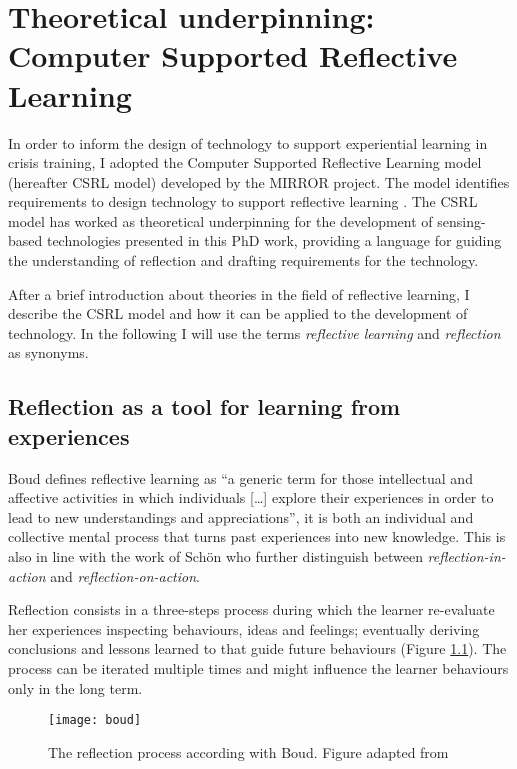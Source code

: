 \chapter{Theoretical underpinning: Computer Supported Reflective Learning}\label{csrl}


In order to inform the design of technology to support experiential learning in crisis training, I adopted the Computer Supported Reflective Learning model (hereafter CSRL model) developed by the MIRROR project. The model identifies requirements to design technology to support reflective learning \autocite{Krogstie:2013kf}. The CSRL model has worked as theoretical underpinning for the development of sensing-based technologies presented in this PhD work, providing a language for guiding the understanding of reflection and drafting requirements for the technology.

After a brief introduction about theories in the field of reflective learning, I describe the CSRL model and how it can be applied to the development of technology. In the following I will use the terms \emph{reflective learning} and \emph{reflection} as synonyms.

\section{Reflection as a tool for learning from experiences}\label{reflection-as-a-tool-for-learning-from-experiences}

Boud \autocite*{boud1985reflection} defines reflective learning as ``a generic term for those intellectual and affective activities in which individuals {[}\ldots{}{]} explore their experiences in order to lead to new understandings and appreciations'', it is both an individual and collective mental process that turns past experiences into new knowledge. This is also in line with the work of Sch\"on \autocite*{Schon:1983ut} who further distinguish between \emph{reflection-in-action} and \emph{reflection-on-action}.

Reflection consists in a three-steps process during which the learner re-evaluate her experiences inspecting behaviours, ideas and feelings; eventually deriving conclusions and lessons learned to that guide future behaviours (Figure \ref{fig:boud-model}). The process can be iterated multiple times and might influence the learner behaviours only in the long term.
\begin{figure}
	[tbh] \centering 
	\texttt{[image: boud]} \caption{The reflection process according with Boud. Figure adapted from \protect\autocite{boud1985reflection}} \label{fig:boud-model} 
\end{figure}

